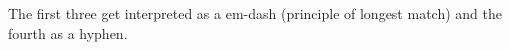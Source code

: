 The first three get interpreted as a em-dash (principle of longest
match) and the fourth as a hyphen.
